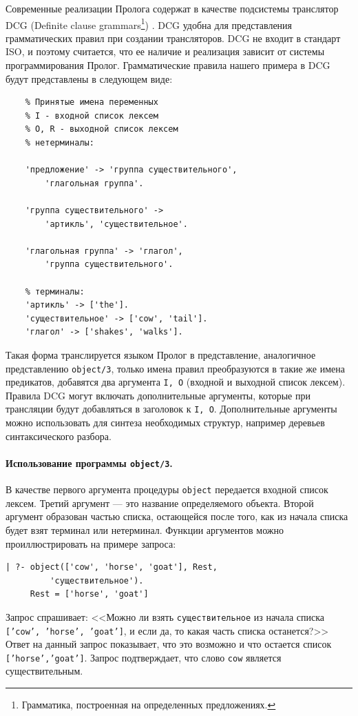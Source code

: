 \documentclass[12pt, openany, twoside]{book} %
\begin{document}
Современные реализации Пролога содержат в качестве подсистемы транслятор DCG (Definite clause grammars\footnote{Грамматика, построенная на определенных предложениях.}) \cite{WIKI-DCG}.  DCG удобна для представления грамматических правил при создании трансляторов. DCG не входит в стандарт ISO, и поэтому считается, что ее наличие и реализация зависит от системы программирования Пролог. Грамматические правила нашего примера в DCG будут представлены в следующем виде:
{\tt\begin{verbatim}
    % Принятые имена переменных
    % I - входной список лексем
    % О, R - выходной список лексем
    % нетерминалы:

    'предложение' -> 'группа существительного',
        'глагольная группа'.

    'группа существительного' ->
        'артикль', 'существительное'.

    'глагольная группа' -> 'глагол',
        'группа существительного'.

    % терминалы:
    'артикль' -> ['the'].
    'существительное' -> ['cow', 'tail'].
    'глагол' -> ['shakes', 'walks'].
\end{verbatim}}
\noindent{} Такая форма транслируется языком Пролог в представление, аналогичное представлению \texttt{object/3}, только имена правил преобразуются в такие же имена предикатов, добавятся два аргумента \texttt{I, O} (входной и выходной список лексем). Правила DCG могут включать дополнительные аргументы, которые при трансляции будут добавляться в заголовок к \texttt{I, O}. Дополнительные аргументы можно использовать для синтеза необходимых структур, например деревьев синтаксического разбора.

\paragraph{Использование программы {\tt object/3}.} В качестве первого аргумента процедуры {\tt object} передается входной список лексем. Третий аргумент --- это название определяемого объекта. Второй аргумент образован частью списка, остающейся после того, как из начала списка будет взят терминал или нетерминал. Функции аргументов можно проиллюстрировать на примере запроса:

{\tt\begin{verbatim}
| ?- object(['cow', 'horse', 'goat'], Rest,
         'существительное').
     Rest = ['horse', 'goat']
\end{verbatim}}

Запрос спрашивает: <<Можно ли взять {\tt существительное} из начала списка {\tt ['cow', 'horse', 'goat']}, и если да, то какая часть списка останется?>> Ответ на данный запрос показывает, что это возможно и что остается список {\tt ['horse','goat']}. Запрос подтверждает, что слово {\tt cow} является существительным.
\end{document}
